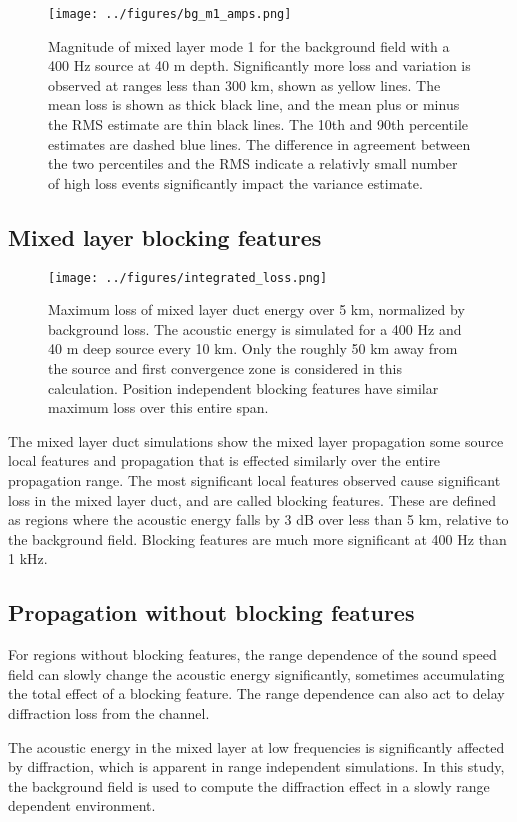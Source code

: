 \documentclass[preprint,NumberedRefs]{JASA}
\begin{document}
\begin{figure}
\texttt{[image: ../figures/bg\_m1\_amps.png]}
    \caption{Magnitude of mixed layer mode 1 for the background field with a 400 Hz source at 40 m depth. Significantly more loss and variation is observed at ranges less than 300 km, shown as yellow lines. The mean loss is shown as thick black line, and the mean plus or minus the RMS estimate are thin black lines. The 10th and 90th percentile estimates are dashed blue lines. The difference in agreement between the two percentiles and the RMS indicate a relativly small number of high loss events significantly impact the variance estimate.}
    \label{fig:bg_eng}
\end{figure}

\subsection{Mixed layer blocking features}
\begin{figure}
\texttt{[image: ../figures/integrated\_loss.png]}
    \caption{Maximum loss of mixed layer duct energy over 5 km, normalized by background loss. The acoustic energy is simulated for a 400 Hz and 40 m deep source every 10 km. Only the roughly 50 km away from the source and first convergence zone is considered in this calculation. Position independent blocking features have similar maximum loss over this entire span.}
    \label{fig:bg_eng}
\end{figure}

The mixed layer duct simulations show the mixed layer propagation some source  local features and propagation that is effected similarly over the entire propagation range. The most significant local features observed cause significant loss in the mixed layer duct, and are called blocking features. These are defined as regions where the acoustic energy falls by 3 dB over less than 5 km, relative to the background field. Blocking features are much more significant at 400 Hz than 1 kHz.

\subsection{Propagation without blocking features}
For regions without blocking features, the range dependence of the sound speed field can slowly change the acoustic energy significantly, sometimes accumulating the total effect of a blocking feature. The range dependence can also act to delay diffraction loss from the channel.

The acoustic energy in the mixed layer at low frequencies is significantly affected by diffraction, which is apparent in range independent simulations. In this study, the background field is used to compute the diffraction effect in a slowly range dependent environment.



\end{document}
